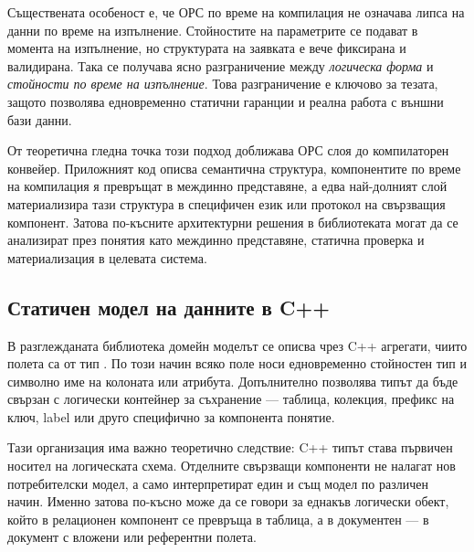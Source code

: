 Съществената особеност е, че ОРС по време на компилация не означава липса на данни по време на изпълнение. Стойностите на параметрите се подават в момента на изпълнение, но структурата на заявката е вече фиксирана и валидирана. Така се получава ясно разграничение между \emph{логическа форма} и \emph{стойности по време на изпълнение}. Това разграничение е ключово за тезата, защото позволява едновременно статични гаранции и реална работа с външни бази данни.

От теоретична гледна точка този подход доближава ОРС слоя до компилаторен конвейер. Приложният код описва семантична структура, компонентите по време на компилация я превръщат в междинно представяне, а едва най-долният слой материализира тази структура в специфичен език или протокол на свързващия компонент. Затова по-късните архитектурни решения в библиотеката могат да се анализират през понятия като междинно представяне, статична проверка и материализация в целевата система.

\subsection{Статичен модел на данните в C++}

В разглежданата библиотека домейн моделът се описва чрез C++ агрегати, чиито полета са от тип . По този начин всяко поле носи едновременно стойностен тип и символно име на колоната или атрибута. Допълнително  позволява типът да бъде свързан с логически контейнер за съхранение --- таблица, колекция, префикс на ключ, label или друго специфично за компонента понятие.

Тази организация има важно теоретично следствие: C++ типът става първичен носител на логическата схема. Отделните свързващи компоненти не налагат нов потребителски модел, а само интерпретират един и същ модел по различен начин. Именно затова по-късно може да се говори за еднакъв логически обект, който в релационен компонент се превръща в таблица, а в документен --- в документ с вложени или референтни полета.

